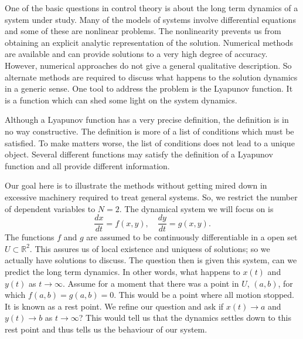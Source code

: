 \documentclass[12pt]{article}
\def      \RR             {{\mathbb R}}
\begin{document}
One of the basic questions in control theory is about the long term
dynamics of a system under study.  Many of the models of systems
involve differential equations and some of these are nonlinear
problems.  The nonlinearity prevents us from obtaining an explicit
analytic representation of the solution. Numerical methods are
available and can provide solutions to a very high degree of accuracy.
However, numerical approaches do not give a general qualitative
description.  So alternate methods are required to discuss what
happens to the solution dynamics in a generic sense.  One tool to
address the problem is the Lyapunov function.  It is a function which
can shed some light on the system dynamics.

Although a Lyapunov function has a very precise definition, the
definition is in no way constructive.   The definition is more of a
list of conditions which must be satisfied.  To make matters worse,
the list of conditions does not lead to a unique object.  Several
different functions may satisfy the definition of a Lyapunov function
and all provide  different information.

Our goal here is to illustrate the methods without getting mired down
in excessive machinery required to treat general systems.  So, we
restrict the number of dependent variables to $N=2$.  The dynamical
system we will focus on is
$$\frac{dx}{dt} = f(x,y), \quad \frac{dy}{dt} = g(x,y).$$
The functions $f$ and $g$ are assumed to be continuously
differentiable in a open set $U \subset {\RR}^2$.  This assures us of
local existence and uniquess of solutions; so we actually have
solutions to discuss.  The question then is given this system, can we
predict the long term dynamics.  In other words, what happens to
$x(t)$ and $y(t)$ as $t \to \infty$.  Assume for a moment that there
was a point in $U$, $(a,b)$, for which $f(a,b) = g(a,b)=0$.  This
would be a point where all motion stopped.  It is known as a rest
point.  We refine our question and ask if $x(t)\to a$ and $y(t)\to b$
as $t \to \infty$?  This would tell us that the dynamics settles down
to this rest point and thus tells us the behaviour of our system.   
\end{document}
